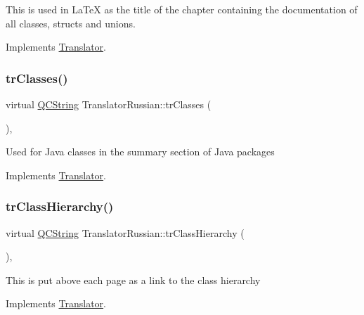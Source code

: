 This is used in La\+TeX as the title of the chapter containing the documentation of all classes, structs and unions. 

Implements \mbox{\hyperlink{class_translator}{Translator}}.

\mbox{\label{class_translator_russian_ab06e4432f73f958f5af88c6deab79414}} 
\subsubsection{\texorpdfstring{trClasses()}{trClasses()}}
{\footnotesize\ttfamily virtual \mbox{\hyperlink{class_q_c_string}{Q\+C\+String}} Translator\+Russian\+::tr\+Classes (\begin{DoxyParamCaption}{ }\end{DoxyParamCaption})\hspace{0.3cm}{\ttfamily [inline]}, {\ttfamily [virtual]}}

Used for Java classes in the summary section of Java packages 

Implements \mbox{\hyperlink{class_translator}{Translator}}.

\mbox{\label{class_translator_russian_aa8510e2ccd7f12950b8383875ec5bf2b}} 
\subsubsection{\texorpdfstring{trClassHierarchy()}{trClassHierarchy()}}
{\footnotesize\ttfamily virtual \mbox{\hyperlink{class_q_c_string}{Q\+C\+String}} Translator\+Russian\+::tr\+Class\+Hierarchy (\begin{DoxyParamCaption}{ }\end{DoxyParamCaption})\hspace{0.3cm}{\ttfamily [inline]}, {\ttfamily [virtual]}}

This is put above each page as a link to the class hierarchy 

Implements \mbox{\hyperlink{class_translator}{Translator}}.

\mbox{\label{class_translator_russian_a42691a47ebafb9216afa86a48e208d48}} 
